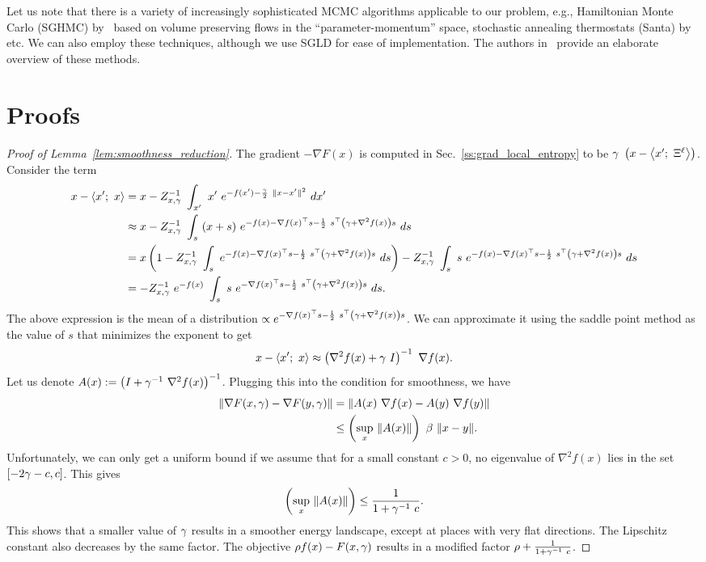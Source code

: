 \documentclass[10pt]{article}
\newcommand{\minibatch}[1]{\Xi^{#1}}
\begin{document}
\begin{appendices}
Let us note that there is a variety of increasingly sophisticated MCMC algorithms applicable to our problem, e.g., Hamiltonian Monte Carlo (SGHMC) by~\citet{chen2014stochastic} based on volume preserving flows in the ``parameter-momentum'' space, stochastic annealing thermostats (Santa) by~\citet{chen2015bridging} etc. We can also employ these techniques, although we use SGLD for ease of implementation. The authors in~\citet{ma2015complete} provide an elaborate overview of these methods.

\section{Proofs}
\label{s:app:proofs}

\begin{proof}[Proof of Lemma~\ref{lem:smoothness_reduction}]
The gradient $-\nabla F(x)$ is computed in Sec.~\ref{ss:grad_local_entropy} to be $\g\ \rbrac{x - \ag{x';\ \minibatch{\ell}}}$. Consider the term
\begin{align*}
    x - \ag{x';\ x}
    &= x - Z_{x,\g}^{-1}\ \int_{x'}\ x'\ e^{-f(x') - \f{\g}{2}\ \norm{x-x'}^2}\ dx'\\
    &\approx x - Z_{x,\g}^{-1}\ \int_{s}\ (x + s)\ e^{-f(x) - \nabla f(x)^\top s - \f{1}{2}\ s^\top \rbrac{\g + \nabla^2 f(x)} s}\ ds\\
    &= x\rbrac{1 -  Z_{x,\g}^{-1}\ \int_{s}\ e^{-f(x) - \nabla f(x)^\top s - \f{1}{2}\ s^\top \rbrac{\g + \nabla^2 f(x)} s}\ ds} - Z_{x,\g}^{-1}\ \int_{s}\ s\ e^{-f(x) - \nabla f(x)^\top s - \f{1}{2}\ s^\top \rbrac{\g + \nabla^2 f(x)} s}\ ds\\
    &= -Z_{x,\g}^{-1}\ e^{-f(x)}\ \int_{s}\ s\ e^{-\nabla f(x)^\top s - \f{1}{2}\ s^\top \rbrac{\g + \nabla^2 f(x)} s}\ ds.
\end{align*}
The above expression is the mean of a distribution $\propto e^{-\nabla f(x)^\top s - \frac{1}{2}\ s^\top \left(\gamma + \nabla^2 f(x)\right) s}$. We can approximate it using the saddle point method as the value of $s$ that minimizes the exponent to get
$$
    x - \left\langle x';\ x\right\rangle \approx \left(\nabla^2 f(x) + \gamma\ I\right)^{-1}\ \nabla f(x).
$$
Let us denote $A(x) := \left(I + \gamma^{-1}\ \nabla^2 f(x)\right)^{-1}$. Plugging this into the condition for smoothness, we have
\begin{align*}
    \lVert\nabla F(x, \gamma) - \nabla F(y, \gamma)\rVert
    &= \lVert A(x)\ \nabla f(x) - A(y)\ \nabla f(y)\rVert\\
    &\leq \left(\sup_x\ \lVert A(x)\rVert\right)\ \beta\ \lVert x-y\rVert.
\end{align*}
Unfortunately, we can only get a uniform bound if we assume that for a small constant $c > 0$, no eigenvalue of $\nabla^2 f(x)$ lies in the set $[-2 \gamma -c, c]$. This gives
$$
    \left(\sup_x\ \lVert A(x)\rVert\right) \leq \frac{1}{1+\gamma^{-1}\ c}.
$$
This shows that a smaller value of $\gamma$ results in a smoother energy landscape, except at places with very flat directions. The Lipschitz constant also decreases by the same factor. The objective $\rho f(x) - F(x,\gamma)$ results in a modified factor $\r + \f{1}{1+\g^{-1}\ c}$.
\end{proof}


\end{appendices}
\end{document}
